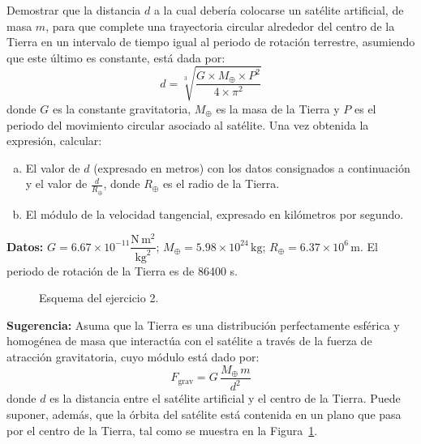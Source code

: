 \documentclass[addpoints]{exam}
\newcommand{\E}[1]{\times 10^{#1}}
\begin{document}
\begin{questions}
    \question Demostrar que la distancia $d$ a la cual debería colocarse un satélite artificial, de masa $m$, para que complete una trayectoria circular alrededor del centro de la Tierra en un intervalo de tiempo igual al periodo de rotación terrestre, asumiendo que este último es constante, está dada por: $$d = \sqrt[3]{\frac{G \times M_\oplus \times P^2}{4 \times \pi^2}}$$ donde $G$ es la constante gravitatoria, $M_\oplus$ es la masa de la Tierra y $P$ es el periodo del movimiento circular asociado al satélite. Una vez obtenida la expresión, calcular:
    \begin{enumerate}[a)]
        \item El valor de $d$ (expresado en metros) con los datos consignados a continuación y el valor de $\frac{d}{R_\oplus}$, donde $R_\oplus$ es el radio de la Tierra.
        \item El módulo de la velocidad tangencial, expresado en kilómetros por segundo.
    \end{enumerate}

    \textbf{Datos:} $G = 6.67 \E{-11} \dfrac{\text{N} \, \text{m}^2}{\text{kg}^2}$; $M_\oplus = 5.98 \E{24} \, \text{kg}$; $R_\oplus = 6.37 \E{6} \, \text{m}$. El periodo de rotación de la Tierra es de 86400 s.

    \begin{figure}[ht]
        \centering
        \caption{Esquema del ejercicio 2.}
        \label{fig:orbita_sat}
    \end{figure}

    \textbf{Sugerencia:} Asuma que la Tierra es una distribución perfectamente esférica y homogénea de masa que interactúa con el satélite a través de la fuerza de atracción gravitatoria, cuyo módulo está dado por: $$F_\text{grav} = G \, \frac{M_\oplus \, m}{d^2}$$ donde $d$ es la distancia entre el satélite artificial y el centro de la Tierra. Puede suponer, además, que la órbita del satélite está contenida en un plano que pasa por el centro de la Tierra, tal como se muestra en la Figura~\ref{fig:orbita_sat}.


\end{questions}
\end{document}
